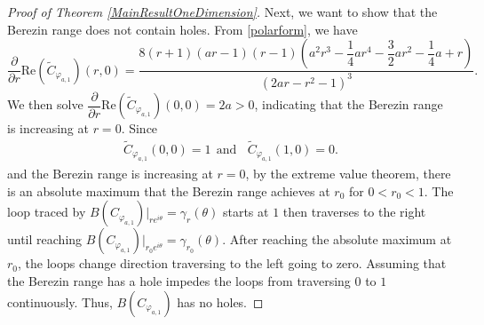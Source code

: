 \documentclass[10pt,a4paper]{amsart}
\begin{document}
\begin{proof}[Proof of Theorem \ref{MainResultOneDimension}]
Next, we want to show that the Berezin range does not contain holes. From \eqref{polarform}, we have 
\[\dfrac{\partial}{\partial r}\mathrm{Re}(\widetilde{C}_{\varphi_{a,1}})(r,0)=\dfrac{8(r+1)(ar-1)(r-1)\left(a^2r^3-\dfrac{1}{4}ar^4-\dfrac{3}{2}ar^2-\dfrac{1}{4}a+r\right)}{(2ar-r^2-1)^3}.\]
We then solve $\dfrac{\partial}{\partial r}\mathrm{Re}(\widetilde{C}_{\varphi_{a,1}})(0,0) =2a>0$, indicating that the Berezin range is increasing at $r=0$. Since
\begin{align*}
\widetilde{C}_{\varphi_{a,1}}(0,0)=1\ \ \mathrm{and}\ \ \ \ \widetilde{C}_{\varphi_{a,1}}(1,0)=0.
\end{align*}
and the Berezin range is increasing at $r=0$, by the extreme value theorem, there is an absolute maximum that the Berezin range achieves at $r_0$ for $0<r_0<1$. The loop traced by $B(C_{\varphi_{a,1}})|_{re^{i\theta}}=\gamma_r(\theta)$ starts at $1$ then traverses to the right until reaching $B(C_{\varphi_{a,1}})|_{r_0e^{i\theta}}=\gamma_{r_0}(\theta)$. After reaching the absolute maximum at $r_0$, the loops change direction traversing to the left going to zero. Assuming that the Berezin range has a hole impedes the loops from traversing $0$ to $1$ continuously. Thus, $B(C_{\varphi_{a,1}})$ has no holes.


\end{proof}
\end{document}
